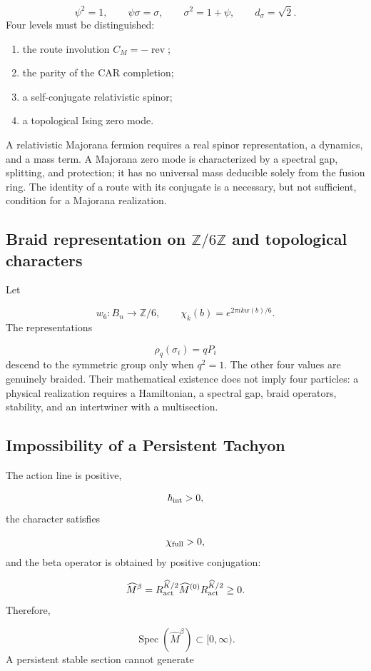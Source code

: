 \[
 \psi^2=1,\qquad
 \psi\sigma=\sigma,\qquad
 \sigma^2=1+\psi,\qquad
 d_\sigma=\sqrt2.
\]
Four levels must be distinguished:

\begin{enumerate}
\item the route involution \(C_M=-\operatorname{rev}\);
\item the parity of the CAR completion;
\item a self-conjugate relativistic spinor;
\item a topological Ising zero mode.
\end{enumerate}
A relativistic Majorana fermion requires a real spinor representation, a dynamics, and a mass term. A Majorana zero mode is characterized by a spectral gap, splitting, and protection; it has no universal mass deducible solely from the fusion ring. The identity of a route with its conjugate is a necessary, but not sufficient, condition for a Majorana realization.

\subsection{Braid representation on \(\mathbb Z/6\mathbb Z\) and topological characters}
Let

\[
 w_6:B_n\longrightarrow\mathbb Z/6,
\qquad
 \chi_k(b)=e^{2\pi ikw(b)/6}.
\]
The representations

\[
 \rho_q(\sigma_i)=qP_i
\]
descend to the symmetric group only when \(q^2=1\). The other four values are genuinely braided. Their mathematical existence does not imply four particles: a physical realization requires a Hamiltonian, a spectral gap, braid operators, stability, and an intertwiner with a multisection.

\subsection{Impossibility of a Persistent Tachyon}
The action line is positive,

\[
 \hbar_{\rm int}>0,
\]
the character satisfies

\[
 \chi_{\rm full}>0,
\]
and the beta operator is obtained by positive conjugation:

\[
 \widehat M^\beta
 =R_{\rm act}^{\widehat K/2}
 \widehat M^{(0)}
 R_{\rm act}^{\widehat K/2}\ge0.
\]
Therefore,

\[
 \operatorname{Spec}(\widehat M^\beta)\subset[0,\infty).
\]
A persistent stable section cannot generate

